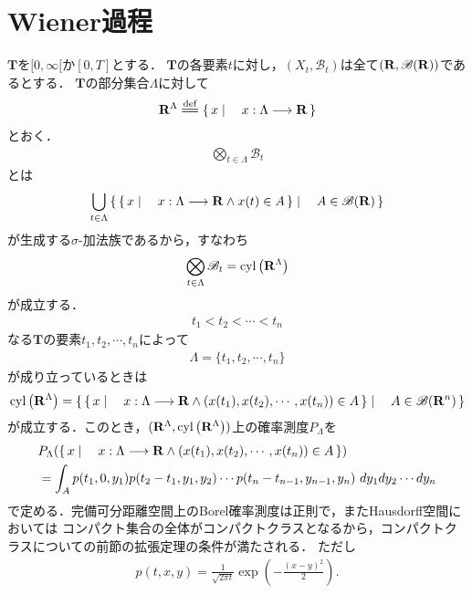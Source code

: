 \section{Wiener過程}
\label{sec:Wiener_process}
	$\mathbf{T}$を$[0,\infty[$か$[0,T]$とする．
	$\mathbf{T}$の各要素$t$に対し，$(X_t,\mathscr{B}_t)$は全て$(\mathbf{R},\mathscr{B}(\mathbf{R}))$であるとする．
	$\mathbf{T}$の部分集合$\Lambda$に対して
	\begin{align}
		\R^\Lambda \defeq \Set{x}{x:\Lambda \longrightarrow \R}
	\end{align}
	とおく．
	\begin{align}
		\bigotimes_{t \in \Lambda} \mathscr{B}_t
	\end{align}
	とは
	\begin{align}
		\bigcup_{t \in \Lambda} \left\{\, \left\{\, x \mid \quad x:\Lambda \longrightarrow \mathbf{R} \wedge x(t) \in A\, \right\} \mid \quad A \in \mathscr{B}(\mathbf{R})\, \right\}
	\end{align}
	が生成する$\sigma$-加法族であるから，すなわち
	\begin{align}
		\bigotimes_{t \in \Lambda} \mathscr{B}_t = \operatorname{cyl}\left(\mathbf{R}^\Lambda\right)
	\end{align}
	が成立する．
	\begin{align}
		t_1 < t_2 < \cdots < t_n
	\end{align}
	なる$\mathbf{T}$の要素$t_1,t_2,\cdots,t_n$によって
	\begin{align}
		\Lambda = \{t_1,t_2,\cdots,t_n\}
	\end{align}
	が成り立っているときは
	\begin{align}
		\operatorname{cyl}\left(\mathbf{R}^\Lambda\right)
		= \left\{\, \left\{\, x \mid \quad x:\Lambda \longrightarrow \mathbf{R} \wedge (x(t_1),x(t_2),\cdots,x(t_n)) \in A\, \right\} \mid \quad A \in \mathscr{B}(\mathbf{R}^n)\, \right\}
	\end{align}
	が成立する．このとき，$(\mathbf{R}^\Lambda,\operatorname{cyl}\left(\mathbf{R}^\Lambda\right))$上の確率測度$P_\Lambda$を
	\begin{align}
		&P_\Lambda(\left\{\, x \mid \quad x:\Lambda \longrightarrow \mathbf{R} \wedge (x(t_1),x(t_2),\cdots,x(t_n)) \in A\, \right\}) \\
		&= \int_A p(t_1,0,y_1)p(t_2-t_1,y_1,y_2) \cdots p(t_n-t_{n-1},y_{n-1},y_n)\ dy_1 dy_2\cdots dy_n
	\end{align}
	で定める．完備可分距離空間上のBorel確率測度は正則で，またHausdorff空間においては
	コンパクト集合の全体がコンパクトクラスとなるから，コンパクトクラスについての前節の拡張定理の条件が満たされる．
	ただし
	\begin{align}
		p(t,x,y) = \frac{1}{\sqrt{2 \pi t}} \exp{\left(-\frac{(x-y)^2}{2}\right)}.
	\end{align}
	
